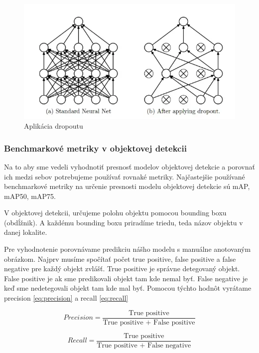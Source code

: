 \begin{figure}[H]
\includegraphics[width=\textwidth]{images/dropout.png}
\centering
\caption{Aplikácia dropoutu}
\label{fig:image303}
\end{figure}


\subsubsection{Benchmarkové metriky v objektovej detekcii}

Na to aby sme vedeli vyhodnotiť presnosť modelov objektovej detekcie a porovnať ich medzi sebov potrebujeme používať rovnaké metriky. Najčastejšie používané benchmarkové metriky na určenie presnosti modelu objektovej detekcie sú mAP, mAP50, mAP75.

V objektovej detekcii, určujeme polohu objektu pomocou bounding boxu (obdĺžnik). A každému bounding boxu priradíme triedu, teda názov objektu v danej lokalite. 

Pre vyhodnotenie porovnávame predikciu nášho modelu s manuálne anotovaným obrázkom. Najprv musíme spočítať počet true positive, false positive a false negative pre každý objekt zvlášť. True positive je správne detegovaný objekt. False positive je ak sme predikovali objekt tam kde nemal byť. False negative je keď sme nedetegovali objekt tam kde mal byť. Pomocou týchto hodnôt vyrátame precision \ref{eq:precision} a recall \ref{eq:recall}

\begin{equation}
Precision = \frac{\text{True positive}}{\text{True positive + False positive}} \label{eq:precision}
\end{equation}

\begin{equation}
Recall = \frac{\text{True positive}}{\text{True positive + False negative}} \label{eq:recall}
\end{equation}

